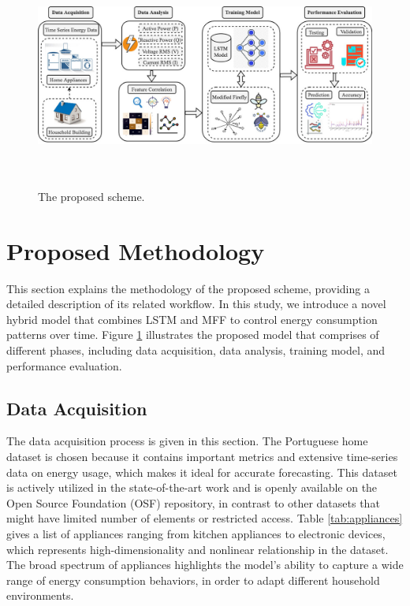\documentclass[journal]{IEEEtran}
\begin{document}
 
 \begin{figure}[!h]
    \centering
    \includegraphics[height=2.92in]{energy prediction/Proposed model(11).jpg}
    \caption{The proposed scheme.}
    \label{fig:proposed model}
\end{figure}


 
\section{Proposed Methodology} \label{Proposed Methodology}
This section explains the methodology of the proposed scheme, providing a detailed description of its related workflow. In this study, we introduce a novel hybrid model that combines LSTM and MFF to control energy consumption patterns over time. Figure \ref{fig:proposed model} illustrates the proposed model that comprises of different phases, including data acquisition, data analysis, training model, and performance evaluation.  

\subsection{Data Acquisition}
The data acquisition process is given in this section. The Portuguese home dataset is chosen because it contains important metrics and extensive time-series data on energy usage, which makes it ideal for accurate forecasting. This dataset is actively utilized in the state-of-the-art work and is openly available on the Open Source Foundation (OSF) repository, in contrast to other datasets that might have limited number of elements or restricted access. Table \ref{tab:appliances} gives a list of appliances ranging from kitchen appliances to electronic devices, which represents  high-dimensionality and nonlinear relationship in the dataset. The broad spectrum of appliances highlights the model's ability to capture a wide range of energy consumption behaviors, in order to adapt different household environments. 
\end{document}
